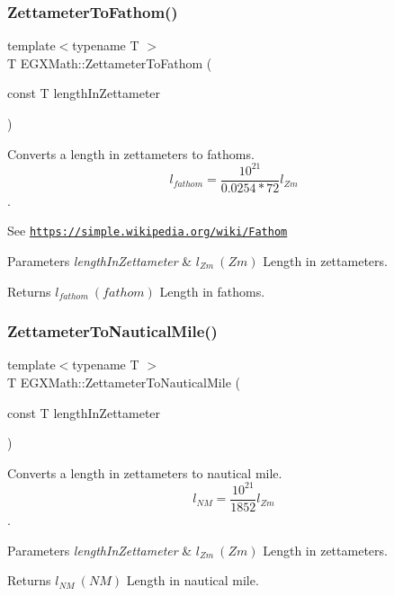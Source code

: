 \subsubsection{\texorpdfstring{Zettameter\+To\+Fathom()}{ZettameterToFathom()}}
{\footnotesize\ttfamily template$<$typename T $>$ \\
T E\+G\+X\+Math\+::\+Zettameter\+To\+Fathom (\begin{DoxyParamCaption}\item[{const T}]{length\+In\+Zettameter }\end{DoxyParamCaption})}



Converts a length in zettameters to fathoms. \[ l_{fathom}= \frac{10^{21}}{0.0254 * 72} l_{Zm} \]. 

See \href{https://simple.wikipedia.org/wiki/Fathom}{\tt https\+://simple.\+wikipedia.\+org/wiki/\+Fathom} 
\begin{DoxyParams}{Parameters}
{\em length\+In\+Zettameter} & $ l_{Zm}\ (Zm)$ Length in zettameters. \\
\hline
\end{DoxyParams}
\begin{DoxyReturn}{Returns}
$ l_{fathom}\ (fathom)$ Length in fathoms. 
\end{DoxyReturn}
\mbox{\label{group___e_g_x_math-_conversions-_length_conversions-_s_i-_zettameter-_nautical_ga474eb2cb88740b3dd9e13fa6e8aa4558}} 
\subsubsection{\texorpdfstring{Zettameter\+To\+Nautical\+Mile()}{ZettameterToNauticalMile()}}
{\footnotesize\ttfamily template$<$typename T $>$ \\
T E\+G\+X\+Math\+::\+Zettameter\+To\+Nautical\+Mile (\begin{DoxyParamCaption}\item[{const T}]{length\+In\+Zettameter }\end{DoxyParamCaption})}



Converts a length in zettameters to nautical mile. \[ l_{NM}= \frac{10^{21}}{1852} l_{Zm} \]. 


\begin{DoxyParams}{Parameters}
{\em length\+In\+Zettameter} & $ l_{Zm}\ (Zm)$ Length in zettameters. \\
\hline
\end{DoxyParams}
\begin{DoxyReturn}{Returns}
$ l_{NM}\ (NM)$ Length in nautical mile. 
\end{DoxyReturn}
